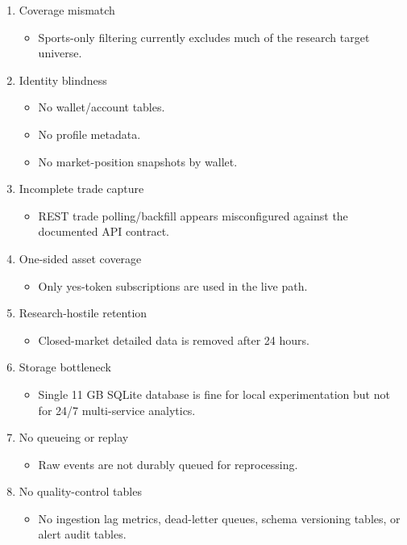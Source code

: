 \documentclass[
]{article}
\providecommand{\tightlist}{%
  \setlength{\itemsep}{0pt}\setlength{\parskip}{0pt}}
\begin{document}
\begin{enumerate}
\def\labelenumi{\arabic{enumi}.}
\item
  Coverage mismatch

  \begin{itemize}
  \tightlist
  \item
    Sports-only filtering currently excludes much of the research target
    universe.
  \end{itemize}
\item
  Identity blindness

  \begin{itemize}
  \tightlist
  \item
    No wallet/account tables.
  \item
    No profile metadata.
  \item
    No market-position snapshots by wallet.
  \end{itemize}
\item
  Incomplete trade capture

  \begin{itemize}
  \tightlist
  \item
    REST trade polling/backfill appears misconfigured against the
    documented API contract.
  \end{itemize}
\item
  One-sided asset coverage

  \begin{itemize}
  \tightlist
  \item
    Only yes-token subscriptions are used in the live path.
  \end{itemize}
\item
  Research-hostile retention

  \begin{itemize}
  \tightlist
  \item
    Closed-market detailed data is removed after 24 hours.
  \end{itemize}
\item
  Storage bottleneck

  \begin{itemize}
  \tightlist
  \item
    Single 11 GB SQLite database is fine for local experimentation but
    not for 24/7 multi-service analytics.
  \end{itemize}
\item
  No queueing or replay

  \begin{itemize}
  \tightlist
  \item
    Raw events are not durably queued for reprocessing.
  \end{itemize}
\item
  No quality-control tables

  \begin{itemize}
  \tightlist
  \item
    No ingestion lag metrics, dead-letter queues, schema versioning
    tables, or alert audit tables.
  \end{itemize}
\end{enumerate}
\end{document}
